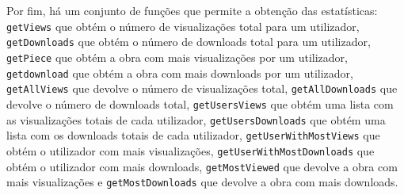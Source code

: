 Por fim, há um conjunto de funções que permite a obtenção das estatísticas: \texttt{getViews} que obtém o número de visualizações total para um utilizador, \texttt{getDownloads} que obtém o número de downloads total para um utilizador, \texttt{getPiece} que obtém a obra com mais visualizações por um utilizador, \texttt{getdownload} que obtém a obra com mais downloads por um utilizador, \texttt{getAllViews} que devolve o número de visualizações total, \texttt{getAllDownloads} que devolve o número de downloads total, \texttt{getUsersViews} que obtém uma lista com as visualizações totais de cada utilizador, \texttt{getUsersDownloads} que obtém uma lista com os downloads totais de cada utilizador, \texttt{getUserWithMostViews} que obtém o utilizador com mais visualizações, \texttt{getUserWithMostDownloads} que obtém o utilizador com mais downloads, \texttt{getMostViewed} que devolve a obra com mais visualizações e \texttt{getMostDownloads} que devolve a obra com mais downloads.

